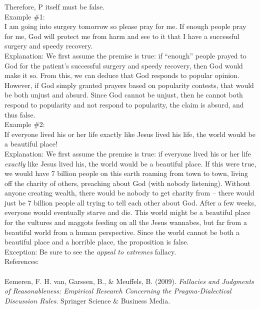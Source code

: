 \documentclass[a4paper,12pt,single,pdftex]{scrartcl}
\begin{document}
{      
        Therefore, P itself must be false.
      \\

      
        Example \#1:
      \\

      
        I am going into surgery tomorrow so please pray for me.  If enough people pray for me, God will protect me from harm and see to it that I have a successful surgery and speedy recovery.
      \\

      
        Explanation: We first assume the premise is true: if “enough” people prayed to God for the patient's successful surgery and speedy recovery, then God would make it so.  From this, we can deduce that God responds to popular opinion.  However, if God simply granted prayers based on popularity contests, that would be both unjust and absurd.  Since God cannot be unjust, then he cannot both respond to popularity and not respond to popularity, the claim is absurd, and thus false.
      \\

      
        Example \#2:
      \\

      
        If everyone lived his or her life exactly like Jesus lived his life, the world would be a beautiful place!
      \\

      
        Explanation: We first assume the premise is true: if everyone lived his or her life {\it exactly} like Jesus lived his, the world would be a beautiful place.  If this were true, we would have 7 billion people on this earth roaming from town to town, living off the charity of others, preaching about God (with nobody listening). Without anyone creating wealth, there would be nobody to get charity from -- there would just be 7 billion people all trying to tell each other about God.  After a few weeks, everyone would eventually starve and die.  This world might be a beautiful place for the vultures and maggots feeding on all the Jesus wannabes, but far from a beautiful world from a human perspective.  Since the world cannot be both a beautiful place and a horrible place, the proposition is false.
      \\

      
        Exception: Be sure to see the {\it appeal to extremes}  fallacy.
      \\

    
    
      References:
    \\

    
      
        
      \\

      
        
          Eemeren, F. H. van, Garssen, B., \& Meuffels, B. (2009). {\it Fallacies and Judgments of Reasonableness: Empirical Research Concerning the Pragma-Dialectical Discussion Rules}. Springer Science \& Business Media.
        
      
    
  }
\end{document}
